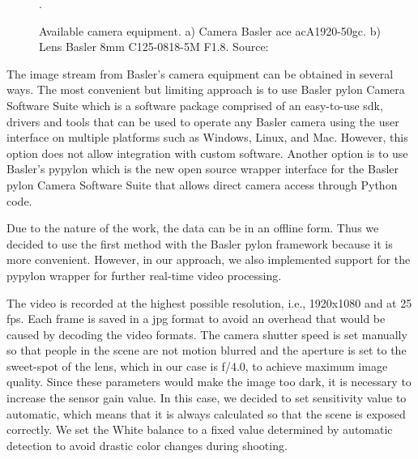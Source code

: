     \begin{figure}[h]
        \centering
        \qquad
        \caption{Available camera equipment. a) Camera Basler ace acA1920-50gc. b) Lens Basler 8mm  C125-0818-5M F1.8. Source: \cite{baslercamera, baslerlens}}.
        \label{fig:camera_equipment}
    \end{figure}
    
    The image stream from Basler's camera equipment can be obtained in several ways. The most convenient but limiting approach is to use Basler pylon Camera Software Suite which is a software package comprised of an easy-to-use \gls{sdk}, drivers and tools that can be used to operate any Basler camera using the user interface on multiple platforms such as Windows, Linux, and Mac. However, this option does not allow integration with custom software. Another option is to use Basler's pypylon \cite{baslerpypylon} which is the new open source wrapper interface for the Basler pylon Camera Software Suite that allows direct camera access through Python code.
    
    Due to the nature of the work, the data can be in an offline form. Thus we decided to use the first method with the Basler pylon framework because it is more convenient. However, in our approach, we also implemented support for the pypylon wrapper for further real-time video processing.
    
    The video is recorded at the highest possible resolution, i.e., 1920x1080 and at 25 \gls{fps}. Each frame is saved in a jpg format to avoid an overhead that would be caused by decoding the video formats. The camera shutter speed is set manually so that people in the scene are not motion blurred and the aperture is set to the sweet-spot of the lens, which in our case is f/4.0, to achieve maximum image quality. Since these parameters would make the image too dark, it is necessary to increase the sensor gain value. In this case, we decided to set sensitivity value to automatic, which means that it is always calculated so that the scene is exposed correctly.  We set the White balance to a fixed value determined by automatic detection to avoid drastic color changes during shooting.

